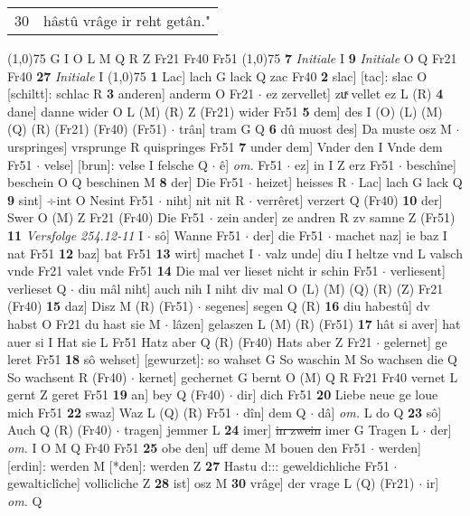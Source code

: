 \documentclass[8pt,a4paper,notitlepage]{article}
\begin{document}
\begin{table}[ht]
\begin{minipage}[t]{0.5\linewidth}
\begin{tabular}{rl}
30 & hâstû vrâge ir reht getân."\\ 
\end{tabular}
\scriptsize
\line(1,0){75} \newline
G I O L M Q R Z Fr21 Fr40 Fr51 \newline
\line(1,0){75} \newline
\textbf{7} \textit{Initiale} I  \textbf{9} \textit{Initiale} O Q Fr21 Fr40  \textbf{27} \textit{Initiale} I  \newline
\line(1,0){75} \newline
\textbf{1} Lac] lach G lack Q zac Fr40 \textbf{2} slac] [tac]: slac O [schiltt]: schlac R \textbf{3} anderen] anderm O Fr21  $\cdot$ ez zervellet] zuͯ vellet ez L (R) \textbf{4} dane] danne wider O L (M) (R) Z (Fr21) wider Fr51 \textbf{5} dem] des I (O) (L) (M) (Q) (R) (Fr21) (Fr40) (Fr51)  $\cdot$ trân] tram G Q \textbf{6} dû muost des] Da muste osz M  $\cdot$ urspringes] vrsprunge R quispringes Fr51 \textbf{7} under dem] Vnder den I Vnde dem Fr51  $\cdot$ velse] [brun]: velse I felsche Q  $\cdot$ ê] \textit{om.} Fr51  $\cdot$ ez] in I Z erz Fr51  $\cdot$ beschîne] beschein O Q beschinen M \textbf{8} der] Die Fr51  $\cdot$ heizet] heisses R  $\cdot$ Lac] lach G lack Q \textbf{9} sint] ÷int O Nesint Fr51  $\cdot$ niht] nit nit R  $\cdot$ verrêret] verzert Q (Fr40) \textbf{10} der] Swer O (M) Z Fr21 (Fr40) Die Fr51  $\cdot$ zein ander] ze andren R zv samne Z (Fr51) \textbf{11} \textit{Versfolge 254.12-11} I   $\cdot$ sô] Wanne Fr51  $\cdot$ der] die Fr51  $\cdot$ machet naz] ie baz I nat Fr51 \textbf{12} baz] bat Fr51 \textbf{13} wirt] machet I  $\cdot$ valz unde] diu I heltze vnd L valsch vnde Fr21 valet vnde Fr51 \textbf{14} Die mal ver lieset nicht ir schin Fr51  $\cdot$ verliesent] verlieset Q  $\cdot$ diu mâl niht] auch nih I niht div mal O (L) (M) (Q) (R) (Z) Fr21 (Fr40) \textbf{15} daz] Disz M (R) (Fr51)  $\cdot$ segenes] segen Q (R) \textbf{16} diu habestû] dv habst O Fr21 du hast sie M  $\cdot$ lâzen] gelaszen L (M) (R) (Fr51) \textbf{17} hât si aver] hat auer si I Hat sie L Fr51 Hatz aber Q (R) (Fr40) Hats aber Z Fr21  $\cdot$ gelernet] ge leret Fr51 \textbf{18} sô wehset] [gewurzet]: so wahset G So waschin M So wachsen die Q So wachsent R (Fr40)  $\cdot$ kernet] gechernet G bernt O (M) Q R Fr21 Fr40 vernet L gernt Z geret Fr51 \textbf{19} an] bey Q (Fr40)  $\cdot$ dir] dich Fr51 \textbf{20} Liebe neue ge loue mich Fr51 \textbf{22} swaz] Waz L (Q) (R) Fr51  $\cdot$ dîn] dem Q  $\cdot$ dâ] \textit{om.} L do Q \textbf{23} sô] Auch Q (R) (Fr40)  $\cdot$ tragen] jemmer L \textbf{24} imer] \sout{in zwein} imer G Tragen L  $\cdot$ der] \textit{om.} I O M Q Fr40 Fr51 \textbf{25} obe den] uff deme M bouen den Fr51  $\cdot$ werden] [erdin]: werden M [*den]: werden Z \textbf{27} Hastu d::: geweldichliche Fr51  $\cdot$ gewalticlîche] vollicliche Z \textbf{28} ist] osz M \textbf{30} vrâge] der vrage L (Q) (Fr21)  $\cdot$ ir] \textit{om.} Q \newline

\end{minipage}
\end{table}
\end{document}
